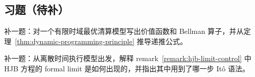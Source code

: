 \subsection*{习题（待补）}

\begin{exercise}
补一题：对一个有限时域最优清算模型写出价值函数和 Bellman 算子，并从定理~\ref{thm:dynamic-programming-principle} 推导递推公式。
\end{exercise}

\begin{exercise}
补一题：从离散时间执行模型出发，解释 remark~\ref{remark:hjb-limit-control} 中 HJB 方程的 formal limit 是如何出现的，并指出其中用到了哪一步 It\^o 语法。
\end{exercise}
